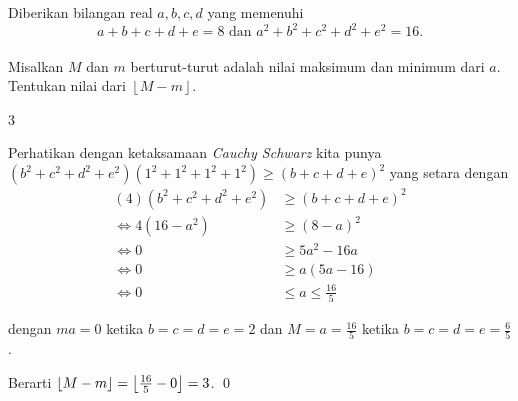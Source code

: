 \documentclass[11pt]{scrartcl}
\begin{document}
	\begin{soalbaru}
		Diberikan bilangan real $a,b,c,d$ yang memenuhi\\[-20pt] $$a+b+c+d+e=8 \text{ dan }a^2+b^2+c^2+d^2+e^2=16.$$\\[-25pt] Misalkan $M$ dan $m$ berturut-turut adalah nilai maksimum dan minimum dari $a$. Tentukan nilai dari $\left \lfloor M-m \right \rfloor$.  %
		
		\begin{jawaban}
		3
		\end{jawaban}
		\begin{solusi}
			Perhatikan dengan ketaksamaan \textit{Cauchy Schwarz} kita punya $(b^2+c^2+d^2+e^2)(1^2+1^2+1^2+1^2) \ge (b+c+d+e)^2$ yang setara dengan 
			\begin{equation*}
			\begin{split}
			(4)(b^2+c^2+d^2+e^2) &\ge (b+c+d+e)^2\\
			\iff 4(16-a^2) &\ge (8-a)^2\\
			\iff 0 &\ge 5a^2-16a\\
			\iff 0 &\ge a(5a-16)\\
			\iff 0 &\le a \le \frac{16}{5}
			\end{split}
			\end{equation*}
			
			dengan $ma=0$ ketika $b=c=d=e=2$ dan $M=a=\frac{16}{5}$ ketika $b=c=d=e=\frac{6}{5}$.
			
			Berarti $\left\lfloor M-m \right\rfloor=\left\lfloor \frac{16}{5}-0 \right\rfloor=3$. \qed
		\end{solusi}
	\end{soalbaru}
	
\end{document}
